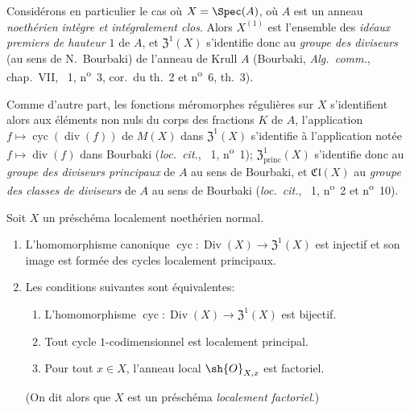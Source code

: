 \begin{env}[21.6.8]
\label{IV.21.6.8}
Considérons en particulier le cas où $X=\Spec(A)$, où $A$ est un anneau \emph{noethérien intègre et intégralement clos}.
Alors $X^{(1)}$ est l'ensemble des \emph{idéaux premiers de hauteur $1$} de $A$, et $\mathfrak{Z}^1(X)$ s'identifie donc au \emph{groupe des diviseurs} (au sens de N.~Bourbaki) de l'anneau de Krull $A$ (Bourbaki, \emph{Alg.\ comm.}, chap.~VII, \textsection~1, n\textsuperscript{o}~3, cor.\ du th.~2 et n\textsuperscript{o}~6, th.~3).

Comme d'autre part, les fonctions méromorphes régulières sur $X$ s'identifient alors aux éléments non nuls du corps des fractions $K$ de $A$, l'application $f\mapsto\operatorname{cyc}(\operatorname{div}(f))$ de $M(X)$ dans $\mathfrak{Z}^1(X)$ s'identifie à l'application notée $f\mapsto\operatorname{div}(f)$ dans Bourbaki (\emph{loc.\ cit.}, \textsection~1, n\textsuperscript{o}~1);
$\mathfrak{Z}^1_\mathrm{princ}(X)$ s'identifie donc au \emph{groupe des diviseurs principaux} de $A$ au sens de Bourbaki, et $\mathfrak{Cl}(X)$ au \emph{groupe des classes de diviseurs} de $A$ au sens de Bourbaki (\emph{loc.\ cit.}, \textsection~1, n\textsuperscript{o}~2 et n\textsuperscript{o}~10).
\end{env}

\begin{theorem}[21.6.9]
\label{IV.21.6.9}
Soit $X$ un préschéma localement noethérien normal.
\begin{enumerate}[label=(\roman*)]
  \item L'homomorphisme canonique $\operatorname{cyc}:\operatorname{Div}(X)\to\mathfrak{Z}^1(X)$ est injectif et son image est formée des cycles localement principaux.
  \item Les conditions suivantes sont équivalentes:
  \begin{enumerate}[label=\emph{\alph*)}]
    \item L'homomorphisme $\operatorname{cyc}:\operatorname{Div}(X)\to\mathfrak{Z}^1(X)$ est bijectif.
    \item Tout cycle $1$-codimensionnel est localement principal.
    \item Pour tout $x\in X$, l'anneau local $\sh{O}_{X,x}$ est factoriel.
  \end{enumerate}
  (On dit alors que $X$ est un préschéma \emph{localement factoriel}.)
\end{enumerate}
\end{theorem}


